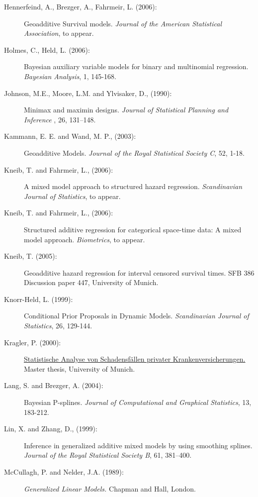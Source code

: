 \documentclass[11pt,a4paper,twoside]{bayesxarticle}
\begin{document}
\begin{description}
\item[Hennerfeind, A., Brezger, A., Fahrmeir, L. (2006):]
Geoadditive Survival models. {\em Journal of the American
Statistical Association}, to appear.

\item[Holmes, C., Held, L. (2006):]
Bayesian auxiliary variable models for binary and multinomial
regression. {\em Bayesian Analysis}, 1, 145-168.

\item[Johnson, M.E., Moore, L.M. and
Ylvisaker, D., (1990):] Minimax and maximin designs. {\it Journal of Statistical Planning and Inference}
, 26, 131--148.

\item[Kammann, E. E. and Wand, M. P., (2003):] Geoadditive Models. {\it Journal of the Royal
Statistical Society C}, 52, 1-18.

\item[Kneib, T. and Fahrmeir, L., (2006):] A mixed model approach
to structured hazard regression. {\em Scandinavian Journal of
Statistics}, to appear.

\item[Kneib, T. and Fahrmeir, L., (2006):] Structured additive
regression for categorical space-time data: A mixed model approach.
{\it Biometrics}, to appear.

\item[Kneib, T. (2005):] Geoadditive hazard regression for interval
censored survival times. SFB 386 Discussion paper 447, University of
Munich.

\item[Knorr-Held, L. (1999):] Conditional Prior Proposals in
Dynamic Models. {\em Scandinavian Journal of Statistics}, 26,
129-144.

\item[Kragler, P. (2000):] \href{http://www.scor.fr/us/2_laureat.asp?pays=2}
{Statistische Analyse von Schadensf\"allen privater
Krankenversicherungen.} Master thesis, University of Munich.


\item[Lang, S. and Brezger, A. (2004):] Bayesian P-splines. {\it
Journal of Computational and Graphical Statistics}, 13, 183-212.

\item[Lin, X. and Zhang, D., (1999):]
Inference in generalized additive mixed models by using smoothing
splines. {\it Journal of the Royal Statistical Society B}, 61,
381--400.

\item[McCullagh, P. and Nelder, J.A. (1989):] {\em Generalized Linear Models.} Chapman and Hall, London.


\end{description}
\end{document}
